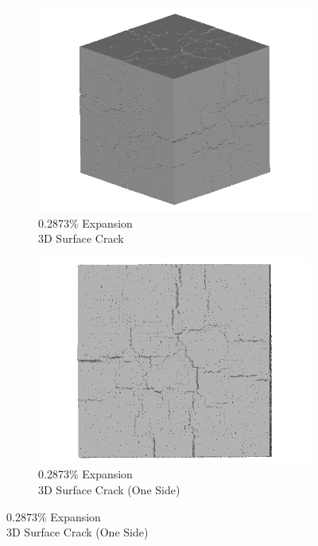 \begin{figure}[ht!]
    \begin{subfigure}{.5\textwidth}
      \centering
      \includegraphics[width=0.5\linewidth]{Files/exp_3D/DEF/A30X0C_2_3d.png}
      \caption{0.2873\% Expansion\\3D Surface Crack}
    \end{subfigure}%
    \begin{subfigure}{.5\textwidth}
      \centering
      \includegraphics[width=0.5\linewidth]{Files/exp_3D/DEF/A30X0C_2_3ds.png}
      \caption{0.2873\% Expansion\\3D Surface Crack (One Side)}
    \end{subfigure}%


\end{figure}
